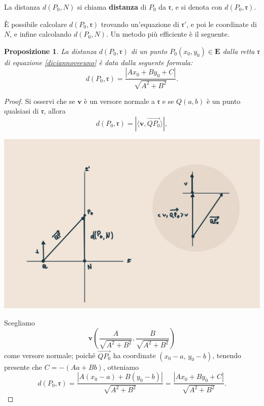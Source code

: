 \documentclass{article}
\theoremstyle{plain}
\newtheorem{prop}[thm]{Proposizione}
\theoremstyle{definition}
\theoremstyle{remark}
\begin{document}
\vspace{10pt}

La distanza $d(P_0, N)$ si chiama \textbf{distanza} di $P_0$ da $\mathfrak{r}$, e si denota con $d(P_0, \mathfrak{r})$.

\vspace{10pt}

È possibile calcolare $d(P_0, \mathfrak{r})$ trovando un'equazione di $\mathfrak{r}'$, e poi le coordinate di $N$, 
e infine calcolando $d(P_0, N)$. Un metodo più efficiente è il seguente.

\vspace{10pt}

\begin{bxthm}
\begin{prop}\label{diciannovetre}
La distanza $d(P_0, \mathfrak{r})$ di un punto $P_0(x_0, y_0)\in\mathbf{E}$ dalla retta $\mathfrak{r}$ 
di equazione \ref{diciannoveeuno} è data dalla seguente formula:
\[
d(P_0, \mathfrak{r}) = \dfrac{|A x_0 + B y_0 + C|}{\sqrt{A^2 + B^2}}.
\]    
\end{prop}
\end{bxthm}
\begin{proof}
Si osservi che se $\mathbf{v}$ è un versore normale a $\mathfrak{r}$ e se $Q(a,b)$ è un punto 
qualsiasi di $\mathfrak{r}$, allora
\[
d(P_0, \mathfrak{r}) = | \langle \mathbf{v}, \overrightarrow{QP_0} \rangle |,
\]
\begin{center}
\includegraphics[scale=0.2]{proiez}    
\end{center}
Scegliamo 
\[\mathbf{v} \left( \dfrac{A}{\sqrt{A^2 + B^2}}, \dfrac{B}{\sqrt{A^2 + B^2}} \right)\]
come versore normale; 
poiché $\overrightarrow{QP_0}$ ha coordinate $(x_0 - a,\,y_0 - b)$, tenendo presente che $C = -(Aa + Bb)$, 
otteniamo
\[
d(P_0, \mathfrak{r}) = \dfrac{|A(x_0 - a) + B(y_0 - b)|}{\sqrt{A^2 + B^2}} = 
\dfrac{|Ax_0 + By_0 + C|}{\sqrt{A^2 + B^2}}.
\]
\end{proof}
\end{document}
